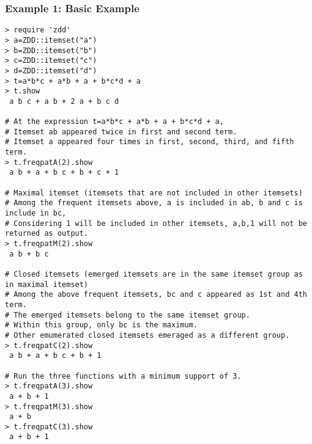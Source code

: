 \subsubsection*{Example 1: Basic Example}



\begin{Verbatim}[baselinestretch=0.7,frame=single]
> require 'zdd'
> a=ZDD::itemset("a")
> b=ZDD::itemset("b")
> c=ZDD::itemset("c")
> d=ZDD::itemset("d")
> t=a*b*c + a*b + a + b*c*d + a
> t.show
 a b c + a b + 2 a + b c d

# At the expression t=a*b*c + a*b + a + b*c*d + a,
# Itemset ab appeared twice in first and second term.
# Itemset a appeared four times in first, second, third, and fifth term.
> t.freqpatA(2).show
 a b + a + b c + b + c + 1

# Maximal itemset (itemsets that are not included in other itemsets)
# Among the frequent itemsets above, a is included in ab, b and c is include in bc,
# Considering 1 will be included in other itemsets, a,b,1 will not be returned as output.
> t.freqpatM(2).show
 a b + b c

# Closed itemsets (emerged itemsets are in the same itemset group as in maximal itemset)
# Among the above frequent itemsets, bc and c appeared as 1st and 4th term.
# The emerged itemsets belong to the same itemset group.
# Within this group, only bc is the maximum.
# Other emumerated closed itemsets emeraged as a different group.
> t.freqpatC(2).show
 a b + a + b c + b + 1

# Run the three functions with a minimum support of 3.
> t.freqpatA(3).show
 a + b + 1
> t.freqpatM(3).show
 a + b
> t.freqpatC(3).show
 a + b + 1
\end{Verbatim}
